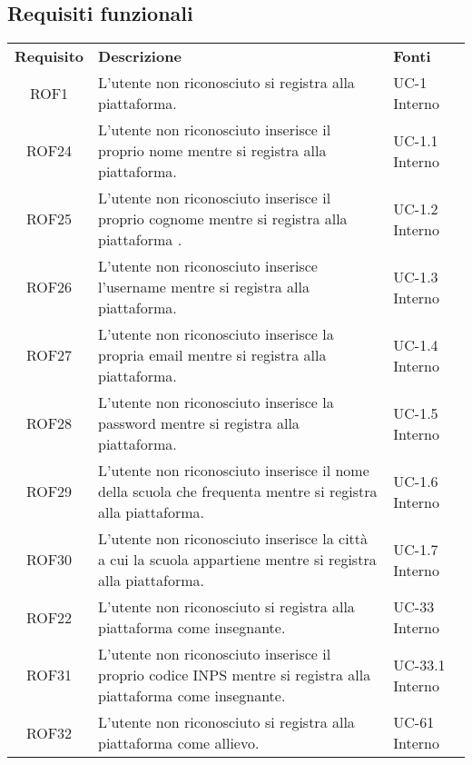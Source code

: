 \subsection{Requisiti funzionali}
\begin{tabularx}{\textwidth}{| c | p{10cm} | X |}
		\rowcolor{LightBlue}
		\color{white}\bfseries Requisito & \color{white}\bfseries Descrizione & \color{white}\bfseries Fonti\\[0.25cm]
		ROF1 & L'utente non riconosciuto si registra alla piattaforma. & UC-1 \newline Interno\\
		ROF24 & L'utente non riconosciuto inserisce il proprio nome mentre si registra alla piattaforma. & UC-1.1 \newline Interno\\
		ROF25 & L'utente non riconosciuto inserisce il proprio cognome mentre si registra alla piattaforma . & UC-1.2 \newline Interno\\
		ROF26 & L'utente non riconosciuto inserisce l'username mentre si registra alla piattaforma. & UC-1.3 \newline Interno\\
		ROF27 & L'utente non riconosciuto inserisce la propria email mentre si registra alla piattaforma. & UC-1.4 \newline Interno\\
		ROF28 & L'utente non riconosciuto inserisce la password mentre si registra alla piattaforma. & UC-1.5 \newline Interno\\
		ROF29 & L'utente non riconosciuto inserisce il nome della scuola che frequenta mentre si registra alla piattaforma. & UC-1.6 \newline Interno\\
		ROF30 & L'utente non riconosciuto inserisce la città a cui la scuola appartiene mentre si registra alla piattaforma. & UC-1.7 \newline Interno\\
		ROF22 & L'utente non riconosciuto si registra alla piattaforma come insegnante. & UC-33 \newline Interno\\
		ROF31 & L'utente non riconosciuto inserisce il proprio codice INPS mentre si registra alla piattaforma come insegnante. & UC-33.1 \newline Interno\\
		ROF32 & L'utente non riconosciuto si registra alla piattaforma come allievo. & UC-61 \newline Interno\\	

\end{tabularx}
